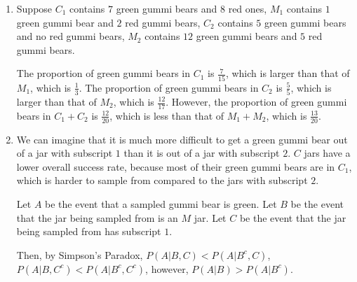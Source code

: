 \begin{enumerate}[label=(\alph*)]
\item Suppose $C_{1}$ contains $7$ green gummi bears and $8$ red ones, $M_{1}$
contains $1$ green gummi bear and $2$ red gummi bears, $C_{2}$ contains $5$
green gummi bears and no red gummi bears, $M_{2}$ contains $12$ green gummi
bears and $5$ red gummi bears.

The proportion of green gummi bears in $C_{1}$ is $\frac{7}{15}$, which is
larger than that of $M_{1}$, which is $\frac{1}{3}$. The proportion of green
gummi bears in $C_{2}$ is $\frac{5}{5}$, which is larger than that of $M_{2}$,
which is $\frac{12}{17}.$ However, the proportion of green gummi bears in $C_{1}
+ C_{2}$ is $\frac{12}{20}$, which is less than that of $M_{1} + M_{2}$, which
is $\frac{13}{20}.$

\item We can imagine that it is much more difficult to get a green gummi bear
out of a jar with subscript $1$ than it is out of a jar with subscript $2$.
$C$ jars have a lower overall success rate, because most of their green gummi
bears are in $C_{1}$, which is harder to sample from compared to the jars with
subscript $2$.

Let $A$ be the event that a sampled gummi bear is green. Let $B$ be the event
that the jar being sampled from is an $M$ jar. Let $C$ be the event that the
jar being sampled from has subscript $1$.

Then, by Simpson's Paradox, $P(A|B, C) < P(A|B^{c}, C)$, $P(A|B, C^{c}) < P
(A|B^{c}, C^{c})$, however, $P(A|B) > P(A|B^{c}).$
\end{enumerate}